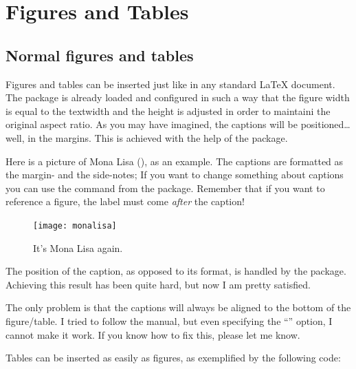 \setchapterpreamble[u]{\margintoc}
\chapter{Figures and Tables\footnotemark[0]}


\section{Normal figures and tables}

Figures and tables can be inserted just like in any standard 
\LaTeX\xspace document. The  package is already loaded 
and configured in such a way that the figure width is equal to the 
textwidth and the height is adjusted in order to maintaini the original 
aspect ratio. As you may have imagined, the captions will be 
positioned\ldots well, in the margins. This is achieved with the help of 
the  package.

Here is a picture of Mona Lisa (), as an example. 
The captions are formatted as the margin- and the side-notes; If you 
want to change something about captions you can use the command 
 from the  package. Remember that if 
you want to reference a figure, the label must come \emph{after} the 
caption!

\begin{figure}[h]
	\texttt{[image: monalisa]}
	\caption[Mona Lisa, again]{It's Mona Lisa again. \blindtext}
\end{figure}

The position of the caption, as opposed to its format, is handled by the 
 package. Achieving this result has been quite hard, 
but now I am pretty satisfied.

\begin{kaobox}[frametitle=To Do]
The only problem is that the captions will always be aligned to the 
bottom of the figure/table. I tried to follow the  
manual, but even specifying the \enquote{} option, I cannot 
make it work. If you know how to fix this, please let me know.
\end{kaobox}

Tables can be inserted as easily as figures, as exemplified by the 
following code:

